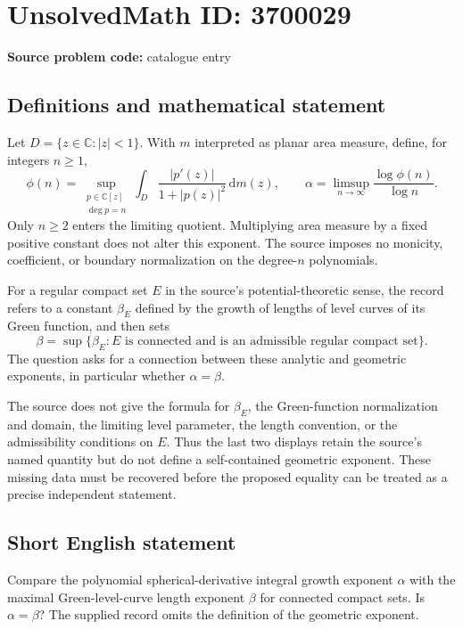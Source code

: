 \documentclass[11pt]{article}
\newcommand{\C}{\mathbb{C}}
\begin{document}
\section*{UnsolvedMath ID: 3700029}
\textbf{Source problem code:} catalogue entry
\subsection{Definitions and mathematical statement}
Let $D=\{z\in\C:|z|<1\}$. With $m$ interpreted as planar area measure, define, for integers $n\geq1$,
\[
\phi(n)=\sup_{\substack{p\in\C[z]\\\deg p=n}}
\int_D\frac{|p'(z)|}{1+|p(z)|^2}\,\mathrm{d}m(z),
\qquad
\alpha=\limsup_{n\to\infty}\frac{\log\phi(n)}{\log n}.
\]
Only $n\geq2$ enters the limiting quotient. Multiplying area measure by a fixed positive constant does not alter this exponent. The source imposes no monicity, coefficient, or boundary normalization on the degree-$n$ polynomials.

For a regular compact set $E$ in the source's potential-theoretic sense, the record refers to a constant $\beta_E$ defined by the growth of lengths of level curves of its Green function, and then sets
\[
\beta=\sup\{\beta_E:E\text{ is connected and is an admissible regular compact set}\}.
\]
The question asks for a connection between these analytic and geometric exponents, in particular whether $\alpha=\beta$.

The source does not give the formula for $\beta_E$, the Green-function normalization and domain, the limiting level parameter, the length convention, or the admissibility conditions on $E$. Thus the last two displays retain the source's named quantity but do not define a self-contained geometric exponent. These missing data must be recovered before the proposed equality can be treated as a precise independent statement.
\subsection{Short English statement}
Compare the polynomial spherical-derivative integral growth exponent $\alpha$ with the maximal Green-level-curve length exponent $\beta$ for connected compact sets. Is $\alpha=\beta$? The supplied record omits the definition of the geometric exponent.
\end{document}
